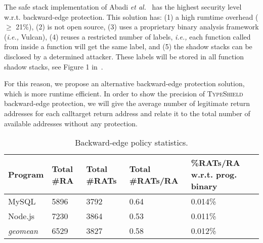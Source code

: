 The safe stack implementation of Abadi \textit{et al.}~\cite{abadi:cfi2} has the highest
security level~\cite{cfi:survey} w.r.t. backward-edge protection. This solution has:
(1) a high rumtime overhead ($\ge$ 21\%), 
(2) is not open source, 
(3) uses a proprietary binary analysis framework (\textit{i.e.,} Vulcan), 
(4) reuses a restricted number of labels, \textit{i.e.,} each function called from inside a function will get the same label, and
(5) the shadow stacks can be disclosed by a determined attacker.
These labels will be stored in all function shadow stacks, see Figure 1 in~\cite{abadi:cfi2}. 

For this reason, we propose an alternative backward-edge protection solution, which is more runtime efficient.
In order to show the precision of \textsc{TypeShield} backward-edge protection, we will give the average number of legitimate return addresses for each calltarget return address 
and relate it to the total number of available addresses without any protection.

\begin{table}[H]
\centering 
 \begin{tabular}{ l | p{.7cm}  | p{.9cm}  | p{1.0cm}  | p{1.8cm} } 
  \textbf{Program}  & Total \#RA    & Total \#RATs  & Total \#RATs/RA  & \%RATs/RA w.r.t. prog. binary \\\hline 
  MySQL             & 5896          & 3792          & 0.64             & 0.014\%                       \\
  Node.js           & 7230          & 3864          & 0.53             & 0.011\%                       \\
  \textit{geomean}  & 6529          & 3827          & 0.58             & 0.012\%                       \\\hline
\end{tabular}
\caption{Backward-edge policy statistics.}
\label{Backward-edge policy statistics.}
\vspace{-.5cm}
\end{table}

